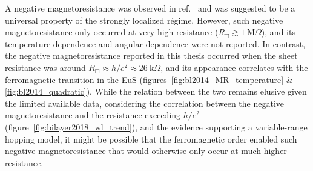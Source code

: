 A negative magnetoresistance was observed in ref.~\cite{liao2015} and was suggested to be a universal property of the strongly localized r\'egime. However, such negative magnetoresistance only occurred at very high resistance ($R_\Box \gtrsim 1~\mathrm{M}\Omega$), and its temperature dependence and angular dependence were not reported. In contrast, the negative magnetoresistance reported in this thesis occurred when the sheet resistance was around $R_\Box \approx h/e^2 \approx 26~\mathrm{k}\Omega$, and its appearance correlates with the ferromagnetic transition in the EuS (figures~\ref{fig:bl2014_MR_temperature} \& \ref{fig:bl2014_quadratic}). While the relation between the two remains elusive given the limited available data, considering the correlation between the negative magnetoresistance and the resistance exceeding $h/e^2$ (figure~\ref{fig:bilayer2018_wl_trend}), and the evidence supporting a variable-range hopping model, it might be possible that the ferromagnetic order enabled such negative magnetoresistance that would otherwise only occur at much higher resistance.